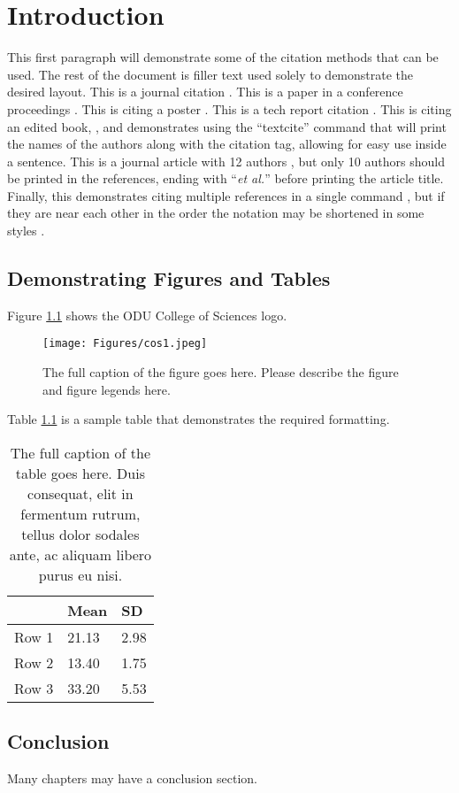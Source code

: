 \chapter{Introduction} 
This first paragraph will demonstrate some of the citation methods that can be used. The rest of the document is filler text used solely to demonstrate the desired layout.  This is a journal citation \autocite{berlin-tweb23}. This is a paper in a conference proceedings \autocite{weigle-jcdl23}. This is citing a poster \autocite{jayanetti-sbp23}. This is a tech report citation \autocite{weigle-2023}. This is citing an edited book, \textcite{vanet-book}, and demonstrates using the ``textcite'' command that will print the names of the authors along with the citation tag, allowing for easy use inside a sentence.  This is a journal article with 12 authors \autocite{coifman2005geometric}, but only 10 authors should be printed in the references, ending with ``\emph{et al.}'' before printing the article title.  Finally, this  demonstrates citing multiple references in a single command \autocites{jones-memento21,vanet-book,weigle-jcdl23}, but if they are near each other in the order the notation may be shortened in some styles \autocites{berlin-tweb23, coifman2005geometric, jayanetti-sbp23}.

\section{Demonstrating Figures and Tables}
Figure \ref{fig:cos1} shows the ODU College of Sciences logo.
\begin{figure}[tbh]
  \centering
  \texttt{[image: Figures/cos1.jpeg]}
  \caption[The short caption of the figure goes here.]{The full caption of the figure goes here. Please describe the figure and figure legends here.}
  \label{fig:cos1}
\end{figure}

Table \ref{tab:table_example1} is a sample table that demonstrates the required formatting.
\begin{table}[tbh]
\caption[The short caption of the table goes here.]{The full caption of the table goes here. Duis consequat, elit in fermentum rutrum, tellus dolor sodales ante, ac aliquam libero purus eu nisi.}
\label{tab:table_example1}
\begin{center}
\begin{tabular}{lll}
      & Mean  & SD   \\ \hline
Row 1 & 21.13 & 2.98 \\ 
Row 2 & 13.40 & 1.75 \\ 
Row 3 & 33.20 & 5.53 \\ \hline
\end{tabular}
\end{center}
\end{table}

\section{Conclusion}
Many chapters may have a conclusion section.
